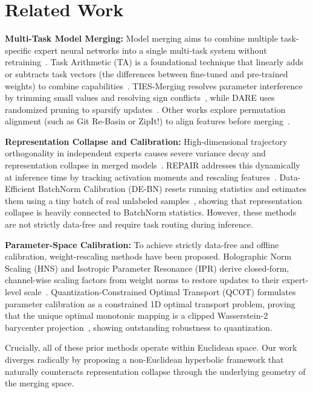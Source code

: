 \documentclass{article}
\theoremstyle{plain}
\theoremstyle{definition}
\theoremstyle{remark}
\begin{document}
\section{Related Work}
\label{sec:related}
\textbf{Multi-Task Model Merging:} Model merging aims to combine multiple task-specific expert neural networks into a single multi-task system without retraining~\cite{wortsman2022model}. Task Arithmetic (TA) is a foundational technique that linearly adds or subtracts task vectors (the differences between fine-tuned and pre-trained weights) to combine capabilities~\cite{ilharco2022editing}. TIES-Merging resolves parameter interference by trimming small values and resolving sign conflicts~\cite{yadav2023ties}, while DARE uses randomized pruning to sparsify updates~\cite{yu2024dare}. Other works explore permutation alignment (such as Git Re-Basin or ZipIt!) to align features before merging~\cite{ainsworth2022git, stoica2023zipit}.

\textbf{Representation Collapse and Calibration:} High-dimensional trajectory orthogonality in independent experts causes severe variance decay and representation collapse in merged models~\cite{jordan2023repair}. REPAIR addresses this dynamically at inference time by tracking activation moments and rescaling features~\cite{jordan2023repair}. Data-Efficient BatchNorm Calibration (DE-BN) resets running statistics and estimates them using a tiny batch of real unlabeled samples~\cite{anonymous2026deconstruction, anonymous2026quantization}, showing that representation collapse is heavily connected to BatchNorm statistics. However, these methods are not strictly data-free and require task routing during inference.

\textbf{Parameter-Space Calibration:} To achieve strictly data-free and offline calibration, weight-rescaling methods have been proposed. Holographic Norm Scaling (HNS) and Isotropic Parameter Resonance (IPR) derive closed-form, channel-wise scaling factors from weight norms to restore updates to their expert-level scale~\cite{anonymous2026deconstruction}. Quantization-Constrained Optimal Transport (QCOT) formulates parameter calibration as a constrained 1D optimal transport problem, proving that the unique optimal monotonic mapping is a clipped Wasserstein-2 barycenter projection~\cite{anonymous2026qcot}, showing outstanding robustness to quantization. 

Crucially, all of these prior methods operate within Euclidean space. Our work diverges radically by proposing a non-Euclidean hyperbolic framework that naturally counteracts representation collapse through the underlying geometry of the merging space.
\end{document}
